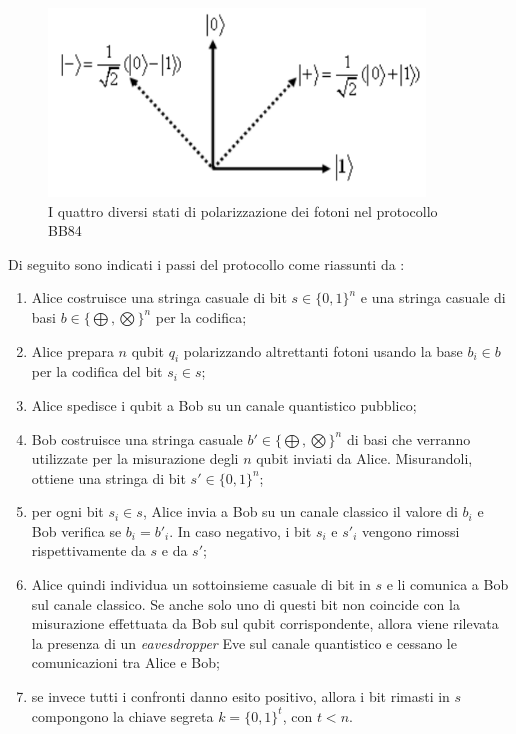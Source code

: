 \begin{figure}[h]
    \centering
    \includegraphics[width=10cm]{immagini/non_orthogonal_bases.png}
    \caption{I quattro diversi stati di polarizzazione dei fotoni nel protocollo BB84 \cite{elboukhari}}
    \label{fig:non_orthogonal_bases}
\end{figure}

Di seguito sono indicati i passi del protocollo come riassunti da \cite{elboukhari}:
\begin{enumerate}
    \item Alice costruisce una stringa casuale di bit $s \in \{0,1\}^n$ e una stringa casuale di basi $b \in \{\bigoplus, \bigotimes\}^n$ per la codifica;
    \item Alice prepara $n$ qubit $q_i$ polarizzando altrettanti fotoni usando la base $b_i \in b$ per la codifica del bit $s_i \in s$;
    \item Alice spedisce i qubit a Bob su un canale quantistico pubblico;
    \item Bob costruisce una stringa casuale $b' \in \{\bigoplus, \bigotimes\}^n$ di basi che verranno utilizzate per la misurazione degli $n$ qubit inviati da Alice. Misurandoli, ottiene una stringa di bit $s' \in \{0,1\}^n$;
    \item per ogni bit $s_i \in s$, Alice invia a Bob su un canale classico il valore di $b_i$ e Bob verifica se $b_i = b'_i$. In caso negativo, i bit $s_i$ e $s'_i$ vengono rimossi rispettivamente da $s$ e da $s'$;
    \item Alice quindi individua un sottoinsieme casuale di bit in $s$ e li comunica a Bob sul canale classico. Se anche solo uno di questi bit non coincide con la misurazione effettuata da Bob sul qubit corrispondente, allora viene rilevata la presenza di un \textit{eavesdropper} Eve sul canale quantistico e cessano le comunicazioni tra Alice e Bob;
    \item se invece tutti i confronti danno esito positivo, allora i bit rimasti in $s$ compongono la chiave segreta $ k = \{0,1\}^t$, con $t < n$.
\end{enumerate}

